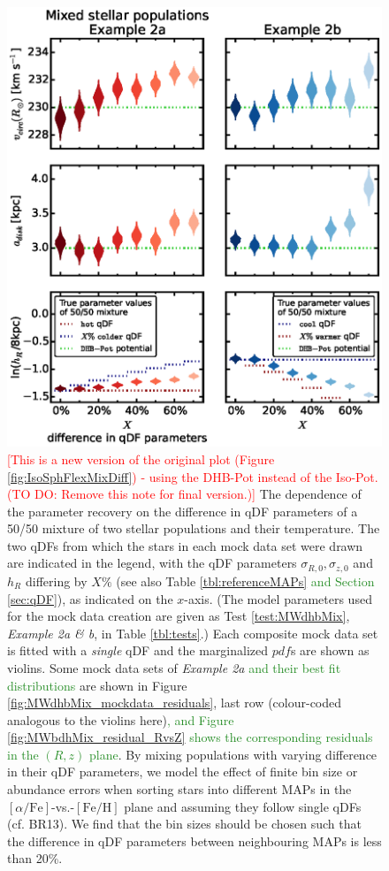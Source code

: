 \documentclass[iop,revtex4]{emulateapj}
\newcommand{\pdf}{\ensuremath{pdf}}
\newcommand{\MAPs}{MAPs}
\newcommand{\NEW}[1]{\textcolor{ForestGreen}{#1}}
\newcommand{\NOTE}[1]{\textcolor{Red}{#1}}
\begin{document}
\begin{figure}[!htbp]
\centering
\includegraphics[scale=0.55]{figs/MWbdhMixDiff_violins.eps}
\caption{\NOTE{[This is a new version of the original plot (Figure \ref{fig:IsoSphFlexMixDiff}) - using the DHB-Pot instead of the Iso-Pot. (TO DO: Remove this note for final version.)]} The dependence of the parameter recovery on the difference in qDF parameters of a 50/50 mixture of two stellar populations and their temperature. The two qDFs from which the stars in each mock data set were drawn are indicated in the legend, with the qDF parameters $\sigma_{R,0}, \sigma_{z,0}$ and $h_R$ differing by $X\%$ (see also Table \ref{tbl:referenceMAPs} \NEW{and Section \ref{sec:qDF}}), as indicated on the $x$-axis. (The model parameters used for the mock data creation are given as Test \ref{test:MWdhbMix}, \emph{Example 2a \& b}, in Table \ref{tbl:tests}.) Each composite mock data set is fitted with a \emph{single} qDF and the marginalized \pdf{}s are shown as violins. Some mock data sets of \emph{Example 2a} \NEW{and their best fit distributions} are shown in Figure \ref{fig:MWdhbMix_mockdata_residuals}, last row (colour-coded analogous to the violins here)\NEW{, and Figure \ref{fig:MWbdhMix_residual_RvsZ} shows the corresponding residuals in the $(R,z)$ plane}. By mixing populations with varying difference in their qDF parameters, we model the effect of finite bin size or abundance errors when sorting stars into different \MAPs{} in the $[\alpha/\mathrm{Fe}]$-vs.-$[\mathrm{Fe}/\mathrm{H}]$ plane and assuming they follow single qDFs (cf. BR13). We find that the bin sizes should be chosen such that the difference in qDF parameters between neighbouring \MAPs{} is less than 20\%.} 
\label{fig:MWdhbMixDiff}
\end{figure}
\end{document}
